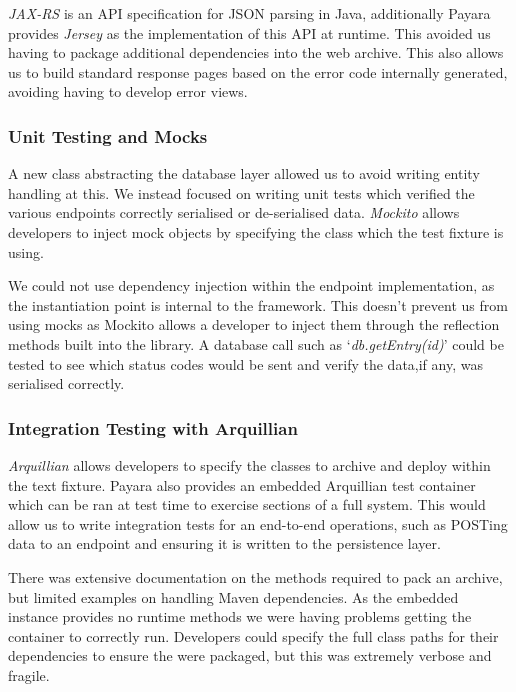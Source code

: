 \par
\textit{JAX-RS} is an API specification for JSON parsing in Java, additionally Payara provides \textit{Jersey} as the implementation of this API at runtime. This avoided us having to package additional dependencies into the web archive. This also allows us to build standard response pages based on the error code internally generated, avoiding having to develop error views.        

\subsubsection{Unit Testing and Mocks}
\par
A new class abstracting the database layer allowed us to avoid writing entity handling at this. We instead focused on writing unit tests which verified the various endpoints correctly serialised or de-serialised data. \textit{Mockito}\cite{Mockito} allows developers to inject mock objects by specifying the class which the test fixture is using.

\par
We could not use dependency injection within the endpoint implementation, as the instantiation point is internal to the framework. This doesn't prevent us from using mocks as Mockito allows a developer to inject them through the reflection methods built into the library. A database call such as `\textit{db.getEntry(id)}' could be tested to see which status codes would be sent and verify the data,if any, was serialised correctly.

\subsubsection{Integration Testing with Arquillian}
\textit{Arquillian}\cite{Arquillian} allows developers to specify the classes to archive and deploy within the text fixture. Payara also provides an embedded Arquillian test container which can be ran at test time to exercise sections of a full system. This would allow us to write integration tests for an end-to-end operations, such as POSTing data to an endpoint and ensuring it is written to the persistence layer.

\par
There was extensive documentation on the methods required to pack an archive, but limited examples on handling Maven dependencies. As the embedded instance provides no runtime methods we were having problems getting the container to correctly run. Developers could specify the full class paths for their dependencies to ensure the were packaged, but this was extremely verbose and fragile.

